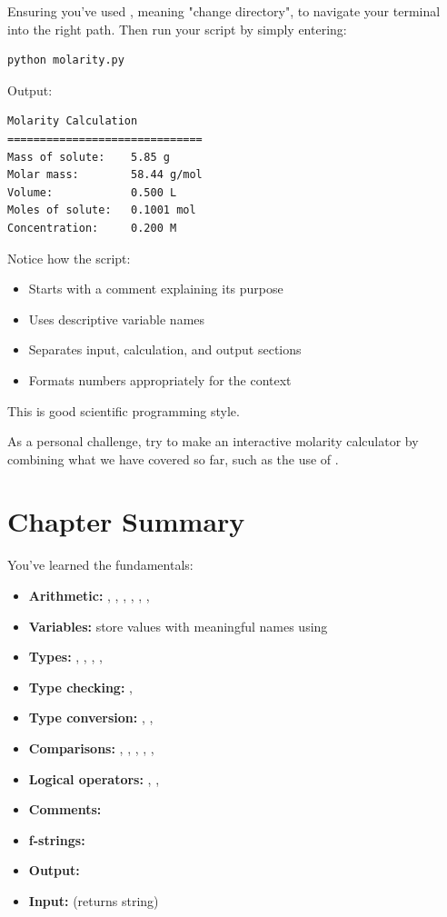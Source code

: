 Ensuring you've used , meaning "change directory", to navigate your terminal into the right path. Then run your script by simply entering:

\begin{lstlisting}[style=shellstyle]
python molarity.py
\end{lstlisting}

Output:
\begin{lstlisting}[style=outputstyle]
Molarity Calculation
==============================
Mass of solute:    5.85 g
Molar mass:        58.44 g/mol
Volume:            0.500 L
Moles of solute:   0.1001 mol
Concentration:     0.200 M
\end{lstlisting}

Notice how the script:
\begin{itemize}
    \item Starts with a comment explaining its purpose
    \item Uses descriptive variable names
    \item Separates input, calculation, and output sections
    \item Formats numbers appropriately for the context
\end{itemize}

This is good scientific programming style. 

As a personal challenge, try to make an interactive molarity calculator by combining what we have covered so far, such as the use of .

\section{Chapter Summary}
\label{sec:basics-summary}

You've learned the fundamentals:

\begin{itemize}
    \item \textbf{Arithmetic:} \py{+}, \py{-}, \py{*}, \py{/}, \py{//}, \py{\%}, \py{**}
    \item \textbf{Variables:} store values with meaningful names using \py{=}
    \item \textbf{Types:} , , , , 
    \item \textbf{Type checking:} , 
    \item \textbf{Type conversion:} , , 
    \item \textbf{Comparisons:} \py{==}, \py{!=}, \py{<}, \py{>}, \py{<=}, \py{>=}
    \item \textbf{Logical operators:} , , 
    \item \textbf{Comments:} 
    \item \textbf{f-strings:} 
    \item \textbf{Output:} 
    \item \textbf{Input:}  (returns string)
\end{itemize}

